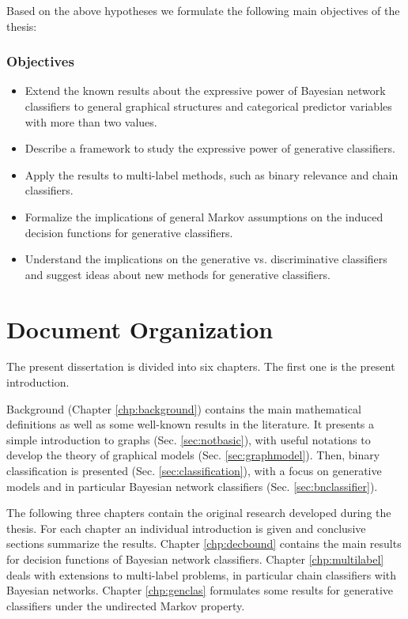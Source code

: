 \documentclass[11pt,a4paper, twoside]{book}
\begin{document}
Based on the above hypotheses we formulate the following main objectives of the thesis:

\subsubsection{Objectives}

\begin{itemize}
\item Extend the known results about the expressive power of Bayesian network classifiers to general graphical structures and categorical predictor variables with more than two values.
\item Describe a framework to study the expressive power of generative classifiers.
\item Apply the results to multi-label methods, such as binary relevance and chain classifiers.
\item Formalize the implications of general Markov assumptions on the induced decision functions for generative classifiers.
\item Understand the implications on the generative vs. discriminative classifiers and suggest ideas about new methods for generative classifiers.
 
\end{itemize}



\section{Document Organization}

The present dissertation is divided into six chapters. The first one is the present introduction.

Background (Chapter \ref{chp:background}) contains the main mathematical definitions as well as some well-known results in the literature. It presents a simple introduction to graphs (Sec. \ref{sec:notbasic}), with useful notations to develop the theory of graphical models (Sec. \ref{sec:graphmodel}). Then, binary classification is presented (Sec. \ref{sec:classification}), with a focus on generative models and in particular Bayesian network classifiers (Sec. \ref{sec:bnclassifier}).

The following three chapters contain the original research developed during the thesis. For each chapter an individual introduction is given and conclusive sections summarize the results.
Chapter \ref{chp:decbound} contains the main results for  decision functions of Bayesian network classifiers. Chapter \ref{chp:multilabel} deals with extensions to multi-label problems, in particular chain classifiers with Bayesian networks. Chapter \ref{chp:genclas} formulates some results for generative classifiers under the undirected Markov property.
\end{document}
